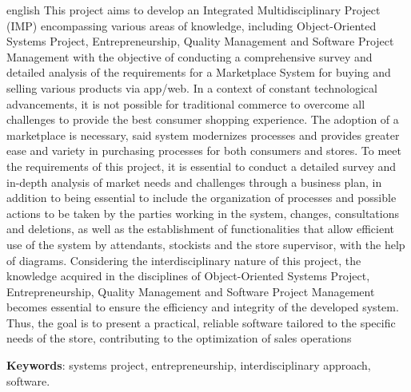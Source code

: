 \documentclass[
	12pt,				%
	openright,			%
	twoside,			%
	a4paper,			%
	english,			%
	brazil				%
	]{abntex2}
\begin{document}
\begin{resumo}[Abstract]
 \begin{otherlanguage*}{english}
	This project aims to develop an Integrated Multidisciplinary Project (IMP) encompassing various areas of knowledge, including Object-Oriented Systems Project, Entrepreneurship, Quality Management and Software Project Management with the objective of conducting a comprehensive survey and detailed analysis of the requirements for a Marketplace System for buying and selling various products via app/web. In a context of constant technological advancements, it is not possible for traditional commerce to overcome all challenges to provide the best consumer shopping experience. The adoption of a marketplace is necessary, said system modernizes processes and provides greater ease and variety in purchasing processes for both consumers and stores. To meet the requirements of this project, it is essential to conduct a detailed survey and in-depth analysis of market needs and challenges through a business plan, in addition to being essential to include the organization of processes and possible actions to be taken by the parties working in the system, changes, consultations and deletions, as well as the establishment of functionalities that allow efficient use of the system by attendants, stockists and the store supervisor, with the help of diagrams. Considering the interdisciplinary nature of this project, the knowledge acquired in the disciplines of Object-Oriented Systems Project, Entrepreneurship, Quality Management and Software Project Management becomes essential to ensure the efficiency and integrity of the developed system. Thus, the goal is to present a practical, reliable software tailored to the specific needs of the store, contributing to the optimization of sales operations

   \vspace{\onelineskip}
 
   \noindent 
   \textbf{Keywords}: systems project, entrepreneurship, interdisciplinary approach, software.
 \end{otherlanguage*}
\end{resumo}



\tableofcontents*
\cleardoublepage


\listoffigures*
\cleardoublepage
\end{document}
